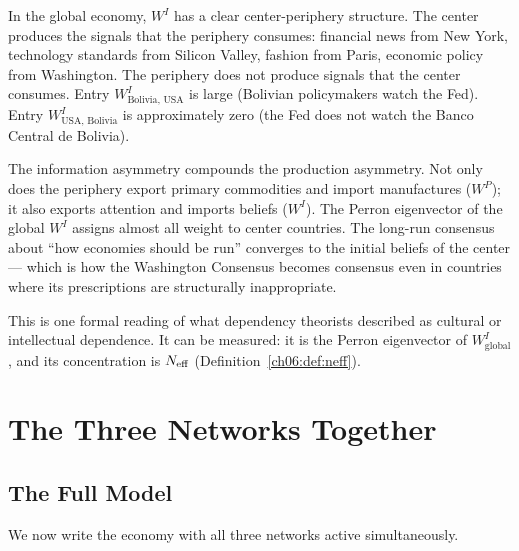 \documentclass[../structural_economics_book.tex]{subfiles}
\begin{document}
\begin{prebisch}
In the global economy, $W^I$ has a clear center-periphery structure. The center produces the signals that the periphery consumes: financial news from New York, technology standards from Silicon Valley, fashion from Paris, economic policy from Washington. The periphery does not produce signals that the center consumes. Entry $W^I_{\text{Bolivia, USA}}$ is large (Bolivian policymakers watch the Fed). Entry $W^I_{\text{USA, Bolivia}}$ is approximately zero (the Fed does not watch the Banco Central de Bolivia).

The information asymmetry compounds the production asymmetry. Not only does the periphery export primary commodities and import manufactures ($W^P$); it also exports attention and imports beliefs ($W^I$). The Perron eigenvector of the global $W^I$ assigns almost all weight to center countries. The long-run consensus about ``how economies should be run'' converges to the initial beliefs of the center --- which is how the Washington Consensus becomes consensus even in countries where its prescriptions are structurally inappropriate.

This is one formal reading of what dependency theorists described as cultural or intellectual dependence. It can be measured: it is the Perron eigenvector of $W^I_{\text{global}}$, and its concentration is $N_{\text{eff}}$ (Definition~\ref{ch06:def:neff}).
\end{prebisch}


\section{The Three Networks Together}
\label{ch05:sec:together}

\subsection{The Full Model}

We now write the economy with all three networks active simultaneously.
\end{document}
